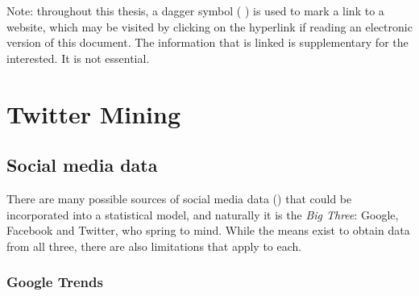 \documentclass{article}
\begin{document}
\vfill

Note: throughout this thesis, a dagger symbol ( \dag{} ) is used to mark a link to a website, which may be visited by clicking on the hyperlink if reading an electronic version of this document. The information that is linked is supplementary for the interested. It is not essential.

\pagebreak

\pagebreak

\section{Twitter Mining \label{chapter-twitter-mining}}
\label{sec-3}


\subsection{Social media data \label{soc-data}}
\label{sec-3-1}

There are many possible sources of social media data (\cite{russell2013miningSocialMediaData}) that could be incorporated into a statistical model, and naturally it is the \emph{Big Three}: Google, Facebook and Twitter, who spring to mind. While the means exist to obtain data from all three, there are also limitations that apply to each.


\subsubsection{Google Trends}
\label{sec-3-1-1}
\end{document}
